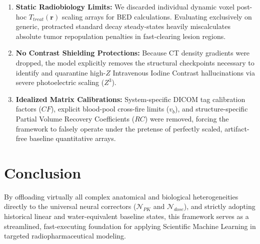 \documentclass[11pt,a4paper]{article}
\begin{document}
\begin{enumerate}
    \item \textbf{Static Radiobiology Limits:} We discarded individual dynamic voxel post-hoc $T_{treat}(\mathbf{r})$ scaling arrays for BED calculations. Evaluating exclusively on generic, protracted standard decay steady-states heavily miscalculates absolute tumor repopulation penalties in fast-clearing lesion regions.
    \item \textbf{No Contrast Shielding Protections:} Because CT density gradients were dropped, the model explicitly removes the structural checkpoints necessary to identify and quarantine high-$Z$ Intravenous Iodine Contrast hallucinations via severe photoelectric scaling ($Z^3$).
    \item \textbf{Idealized Matrix Calibrations:} System-specific DICOM tag calibration factors ($CF$), explicit blood-pool cross-fire limits ($v_b$), and structure-specific Partial Volume Recovery Coefficients ($RC$) were removed, forcing the framework to falsely operate under the pretense of perfectly scaled, artifact-free baseline quantitative arrays.
\end{enumerate}

\section{Conclusion}
By offloading virtually all complex anatomical and biological heterogeneities directly to the universal neural correctors ($\mathcal{N}_{PK}$ and $\mathcal{N}_{dose}$), and strictly adopting historical linear and water-equivalent baseline states, this framework serves as a streamlined, fast-executing foundation for applying Scientific Machine Learning in targeted radiopharmaceutical modeling. 



\end{document}
